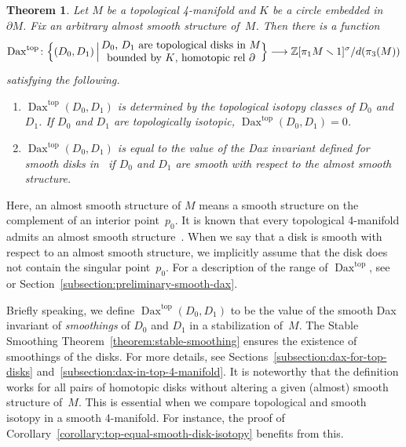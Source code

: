 \documentclass[11pt]{amsart}
\def\to{\mathchoice{\longrightarrow}{\rightarrow}{\rightarrow}{\rightarrow}}
\newtheorem{theoremalpha}{Theorem}\def\thetheoremalpha{\Alph{theoremalpha}}
\theoremstyle{definition}
\theoremstyle{theorem-giventitle}
\theoremstyle{definition-giventitle}
\numberwithin{equation}{section}
\def\Z{\mathbb{Z}}
\def\top{\mathrm{top}}
\def\Dax{\operatorname{Dax}}
\def\setminus{\smallsetminus}
\begin{document}
\begin{theoremalpha}
  \label{theorem:dax-top}
  Let $M$ be a topological 4-manifold and $K$ be a circle embedded in~$\partial M$.
  Fix an arbitrary almost smooth structure of~$M$.
  Then there is a function
  \[
    \Dax^\top\colon \Big\{ (D_0,D_1)\,\Big|\,
    \begin{tabular}{@{}c@{}}
      $D_0$, $D_1$ are topological disks in $M$\\
      bounded by $K$, homotopic rel $\partial$ 
    \end{tabular} \Big\}
    \to \Z[\pi_1M\setminus 1]^\sigma  / d(\pi_3 (M))
  \]
  satisfying the following.
  \begin{enumerate}
    \item $\Dax^\top(D_0,D_1)$ is determined by the topological isotopy classes of $D_0$ and $D_1$.
    If $D_0$ and $D_1$ are topologically isotopic, $\Dax^\top(D_0,D_1)=0$.
    \item $\Dax^\top(D_0,D_1)$ is equal to the value of the Dax invariant defined for smooth disks in~\cite{Gabai:2021-1,Kosanovic-Teichner:2024-1,Kosanovic-Teichner:2024-2,Schwartz:2021-1} if $D_0$ and $D_1$ are smooth with respect to the almost smooth structure.
  \end{enumerate}
\end{theoremalpha}

Here, an almost smooth structure of $M$ means a smooth structure on the complement of an interior point~$p_0$.
It is known that every topological 4-manifold admits an almost smooth structure~\cite[8.2]{Freedman-Quinn:1990-1}.
When we say that a disk is smooth with respect to an almost smooth structure, we implicitly assume that the disk does not contain the singular point~$p_0$.
For a description of the range of $\Dax^\top$, see \cite{Gabai:2021-1,Kosanovic-Teichner:2024-2} or Section~\ref{subsection:preliminary-smooth-dax}.

Briefly speaking, we define $\Dax^\top(D_0,D_1)$ to be the value of the smooth Dax invariant of \emph{smoothings} of $D_0$ and $D_1$ in a stabilization of~$M$.
The Stable Smoothing Theorem~\ref{theorem:stable-smoothing} ensures the existence of smoothings of the disks.
For more details, see Sections~\ref{subsection:dax-for-top-disks} and~\ref{subsection:dax-in-top-4-manifold}.
It is noteworthy that the definition works for all pairs of homotopic disks without altering a given (almost) smooth structure of~$M$.
This is essential when we compare topological and smooth isotopy in a smooth 4-manifold.
For instance, the proof of Corollary~\ref{corollary:top-equal-smooth-disk-isotopy} benefits from this.
\end{document}
